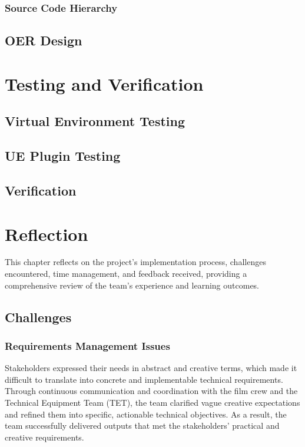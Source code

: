 \documentclass[12pt,a4paper]{report}
\begin{document}
\subsection{Source Code Hierarchy}

\section{OER Design}


\chapter{Testing and Verification}

\section{Virtual Environment Testing}

\section{UE Plugin Testing}

\section{Verification}


\chapter{Reflection}
This chapter reflects on the project’s implementation process, challenges encountered, time management, and feedback received, providing a comprehensive review of the team’s experience and learning outcomes.

\section{Challenges}

\subsection{Requirements Management Issues}
Stakeholders expressed their needs in abstract and creative terms, which made it difficult to translate into concrete and implementable technical requirements. Through continuous communication and coordination with the film crew and the Technical Equipment Team (TET), the team clarified vague creative expectations and refined them into specific, actionable technical objectives. As a result, the team successfully delivered outputs that met the stakeholders’ practical and creative requirements.
\end{document}
